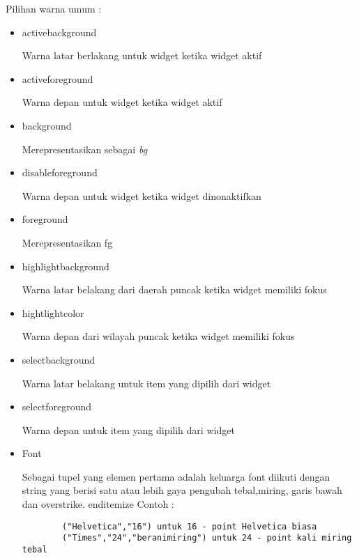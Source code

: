 \documentclass [12pt,a4paper,notitlepage,oneside,bahasa]{article}
\begin{document}
\begin{enumerate}
\vspace{12pt}
Pilihan warna umum :
\noindent 
\begin{itemize}
	\item activebackground \par
	Warna latar berlakang untuk widget ketika widget aktif \par
	\noindent 
	\item activeforeground \par
	Warna depan untuk widget ketika widget aktif \par
	\noindent 
	\item background \par
	Merepresentasikan sebagai \textit{bg} \par
	\noindent 
	\item disableforeground \par
	Warna depan untuk widget ketika widget dinonaktifkan \par
	\noindent 
	\item foreground \par
	Merepresentasikan fg \par
	\noindent 
	\item highlightbackground \par
	Warna latar belakang dari daerah puncak ketika widget memiliki fokus \par
	\noindent 
	\item hightlightcolor \par
	Warna depan dari wilayah puncak ketika widget memiliki fokus \par
	\noindent 
	\item selectbackground \par
	Warna latar belakang untuk item yang dipilih dari widget \par
	\noindent 
	\item selectforeground \par
	Warna depan untuk item yang dipilih dari widget \par
	\noindent 
	\item Font \par
	\noindent 
	Sebagai tupel yang elemen pertama adalah keluarga font diikuti dengan string yang berisi satu atau lebih gaya pengubah tebal,miring, garis bawah dan overstrike. 
	end{itemize}
	\noindent 
Contoh : \par
	\begin{verbatim}
		("Helvetica","16") untuk 16 - point Helvetica biasa
		("Times","24","beranimiring") untuk 24 - point kali miring tebal

\end{verbatim}
\end{itemize}
\end{enumerate}
\end{document}
